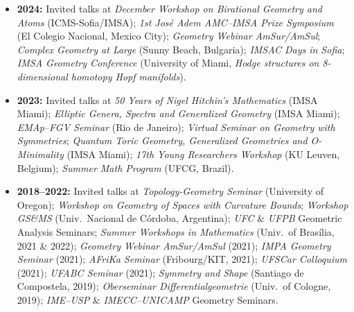 \documentclass[10pt,a4paper]{article}
\begin{document}
\begin{itemize}
\item \textbf{2024:} Invited talks at \emph{December Workshop on Birational Geometry and Atoms} (ICMS-Sofia/IMSA); \emph{1st Jos\'e Adem AMC--IMSA Prize Symposium} (El Colegio Nacional, Mexico City); \emph{Geometry Webinar AmSur/AmSul}; \emph{Complex Geometry at Large} (Sunny Beach, Bulgaria); \emph{IMSAC Days in Sofia}; \emph{IMSA Geometry Conference} (University of Miami, \emph{Hodge structures on 8-dimensional homotopy Hopf manifolds}).
\item \textbf{2023:} Invited talks at \emph{50 Years of Nigel Hitchin's Mathematics} (IMSA Miami); \emph{Elliptic Genera, Spectra and Generalized Geometry} (IMSA Miami); \emph{EMAp--FGV Seminar} (Rio de Janeiro); \emph{Virtual Seminar on Geometry with Symmetries}; \emph{Quantum Toric Geometry, Generalized Geometries and O-Minimality} (IMSA Miami); \emph{17th Young Researchers Workshop} (KU Leuven, Belgium); \emph{Summer Math Program} (UFCG, Brazil).
\item \textbf{2018--2022:} Invited talks at \emph{Topology-Geometry Seminar} (University of Oregon); \emph{Workshop on Geometry of Spaces with Curvature Bounds}; \emph{Workshop GS\&MS} (Univ.\ Nacional de C\'ordoba, Argentina); \emph{UFC} \& \emph{UFPB} Geometric Analysis Seminars; \emph{Summer Workshops in Mathematics} (Univ.\ of Bras\'ilia, 2021 \& 2022); \emph{Geometry Webinar AmSur/AmSul} (2021); \emph{IMPA Geometry Seminar} (2021); \emph{AFriKa Seminar} (Fribourg/KIT, 2021); \emph{UFSCar Colloquium} (2021); \emph{UFABC Seminar} (2021); \emph{Symmetry and Shape} (Santiago de Compostela, 2019); \emph{Oberseminar Differentialgeometrie} (Univ.\ of Cologne, 2019); \emph{IME--USP} \& \emph{IMECC--UNICAMP} Geometry Seminars.
\end{itemize}
\end{document}
